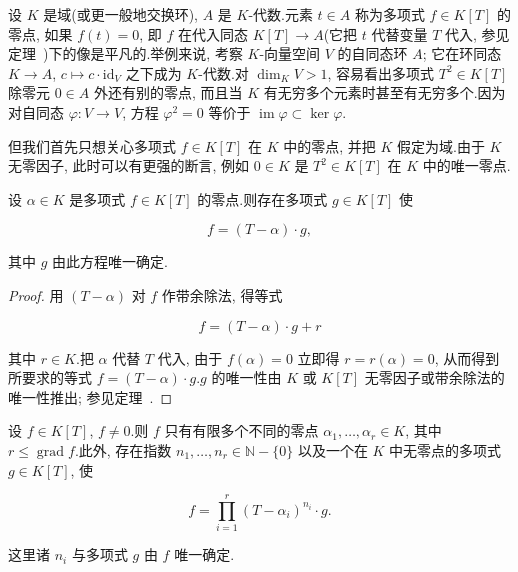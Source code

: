 设 $K$ 是域(或更一般地交换环), $A$ 是 $K$-代数.元素 $t \in A$ 称为多项式 $f \in K[T]$ 的零点, 如果 $f(t) = 0$, 即 $f$ 在代入同态 $K[T] \longrightarrow A$(它把 $t$ 代替变量 $T$ 代入, 参见定理~)下的像是平凡的.举例来说, 考察 $K$-向量空间 $V$ 的自同态环 $A$; 它在环同态 $K \longrightarrow A$, $c \longmapsto c \cdot \mathrm{id}_V$ 之下成为 $K$-代数.对 $\dim_K V > 1$, 容易看出多项式 $T^2 \in K[T]$ 除零元 $0 \in A$ 外还有别的零点, 而且当 $K$ 有无穷多个元素时甚至有无穷多个.因为对自同态 $\varphi \colon V \longrightarrow V$, 方程 $\varphi^2 = 0$ 等价于 $\operatorname{im} \varphi \subset \ker \varphi$.

但我们首先只想关心多项式 $f \in K[T]$ 在 $K$ 中的零点, 并把 $K$ 假定为域.由于 $K$ 无零因子, 此时可以有更强的断言, 例如 $0 \in K$ 是 $T^2 \in K[T]$ 在 $K$ 中的唯一零点.

\begin{theorem}\label{thm:5.3.1}
设 $\alpha \in K$ 是多项式 $f \in K[T]$ 的零点.则存在多项式 $g \in K[T]$ 使

\[
f = (T - \alpha) \cdot g,
\]

其中 $g$ 由此方程唯一确定.
\end{theorem}

\begin{proof}
用 $(T - \alpha)$ 对 $f$ 作带余除法, 得等式

\[
f = (T - \alpha) \cdot g + r
\]

其中 $r \in K$.把 $\alpha$ 代替 $T$ 代入, 由于 $f(\alpha) = 0$ 立即得 $r = r(\alpha) = 0$, 从而得到所要求的等式 $f = (T - \alpha) \cdot g$.$g$ 的唯一性由 $K$ 或 $K[T]$ 无零因子或带余除法的唯一性推出; 参见定理~.
\end{proof}

\begin{corollary}\label{cor:5.3.2}
设 $f \in K[T]$, $f \neq 0$.则 $f$ 只有有限多个不同的零点 $\alpha_1, \ldots, \alpha_r \in K$, 其中 $r \leq \operatorname{grad} f$.此外, 存在指数 $n_1, \ldots, n_r \in \mathbb{N} - \{0\}$ 以及一个在 $K$ 中无零点的多项式 $g \in K[T]$, 使

\[
f = \prod_{i = 1}^{r} (T - \alpha_i)^{n_i} \cdot g\text{.}
\]

这里诸 $n_i$ 与多项式 $g$ 由 $f$ 唯一确定.
\end{corollary}

